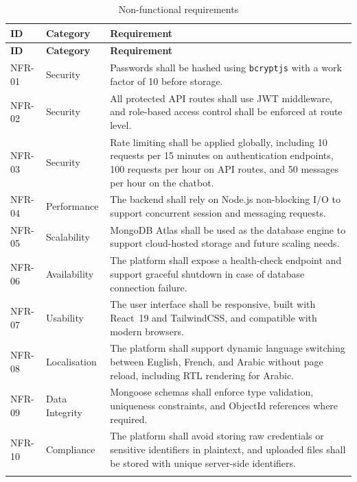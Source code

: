 \documentclass[a4paper,12pt]{report}
\begin{document}
\begin{longtable}{@{} L{1.6cm} L{2.8cm} L{10.2cm} @{}}
\toprule
\bfseries ID &
\bfseries Category &
\bfseries Requirement \\
\midrule
\endfirsthead
\toprule
\bfseries ID &
\bfseries Category &
\bfseries Requirement \\
\midrule
\endhead

NFR-01 & Security & Passwords shall be hashed using \texttt{bcryptjs} with a work factor of 10 before storage. \\
\midrule
NFR-02 & Security & All protected API routes shall use JWT middleware, and role-based access control shall be enforced at route level. \\
\midrule
NFR-03 & Security & Rate limiting shall be applied globally, including 10 requests per 15 minutes on authentication endpoints, 100 requests per hour on API routes, and 50 messages per hour on the chatbot. \\
\midrule
NFR-04 & Performance & The backend shall rely on Node.js non-blocking I/O to support concurrent session and messaging requests. \\
\midrule
NFR-05 & Scalability & MongoDB Atlas shall be used as the database engine to support cloud-hosted storage and future scaling needs. \\
\midrule
NFR-06 & Availability & The platform shall expose a health-check endpoint and support graceful shutdown in case of database connection failure. \\
\midrule
NFR-07 & Usability & The user interface shall be responsive, built with React~19 and TailwindCSS, and compatible with modern browsers. \\
\midrule
NFR-08 & Localisation & The platform shall support dynamic language switching between English, French, and Arabic without page reload, including RTL rendering for Arabic. \\
\midrule
NFR-09 & Data Integrity & Mongoose schemas shall enforce type validation, uniqueness constraints, and ObjectId references where required. \\
\midrule
NFR-10 & Compliance & The platform shall avoid storing raw credentials or sensitive identifiers in plaintext, and uploaded files shall be stored with unique server-side identifiers. \\

\bottomrule
\caption{Non-functional requirements}
\label{tab:nfr}\\
\end{longtable}
\end{document}
